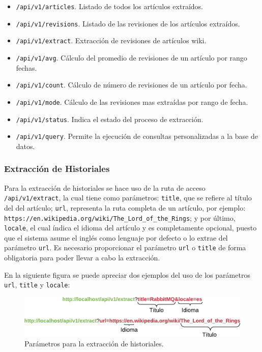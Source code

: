 \begin{itemize}
	\item \texttt{/api/v1/articles}. Listado de todos los artículos extraídos.
	\item \texttt{/api/v1/revisions}. Listado de las revisiones de los artículos extraídos.
	\item \texttt{/api/v1/extract}. Extracción de revisiones de artículos wiki.
	\item \texttt{/api/v1/avg}. Cálculo del promedio de revisiones de un artículo por rango fechas.
	\item \texttt{/api/v1/count}. Cálculo de número de revisiones de un artículo por fecha.
	\item \texttt{/api/v1/mode}. Cálculo de las revisiones mas extraídas por rango de fecha.
	\item \texttt{/api/v1/status}. Indica el estado del proceso de extracción.
	\item \texttt{/api/v1/query}. Permite la ejecución de consultas personalizadas a la base de datos.
\end{itemize}

\subsubsection{Extracción de Historiales}

Para la extracción de historiales se hace uso de la ruta de acceso \texttt{/api/v1/extract}, la cual
tiene como parámetros:
\texttt{title}, que se refiere al título del del artículo; \texttt{url}, representa la ruta completa de un artículo, por ejemplo:
\texttt{https://en.wikipedia.org/wiki/The\_Lord\_of\_the\_Rings}; y por último, \texttt{locale}, el cual índica el idioma del artículo y
es completamente opcional, puesto que el sistema asume el inglés como lenguaje por defecto o lo extrae del parámetro
\texttt{url}.
Es necesario proporcionar el parámetro \texttt{url} o \texttt{title} de forma obligatoria para poder llevar a cabo la extracción.

En la siguiente figura se puede apreciar dos ejemplos del uso de los parámetros \texttt{url}, \texttt{title} y \texttt{locale}:

\begin{figure}[H]
	\centering
		\includegraphics[width=1\textwidth]{figures/extract_url_format}
	\caption{Parámetros para la extracción de historiales.}
	\label{fig:extract_url_format}
\end{figure}

